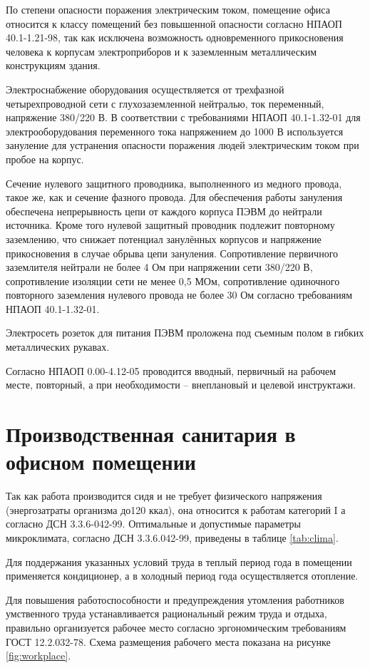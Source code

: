 По степени опасности поражения электрическим током, помещение офиса относится к классу помещений без повышенной
опасности согласно НПАОП 40.1-1.21-98, так как исключена возможность одновременного прикосновения человека к корпусам
электроприборов и к заземленным металлическим конструкциям здания.

Электроснабжение оборудования осуществляется от трехфазной четырехпроводной сети с глухозаземленной нейтралью,
ток переменный, напряжение 380/220 В. В соответствии с требованиями НПАОП 40.1-1.32-01 для электрооборудования
переменного тока напряжением до 1000 В используется зануление для устранения опасности поражения людей электрическим
током при пробое на корпус. 

Сечение нулевого защитного проводника, выполненного из медного провода, такое же, как и сечение фазного провода.
Для обеспечения работы зануления обеспечена непрерывность цепи от каждого корпуса ПЭВМ до нейтрали источника.
Кроме того нулевой защитный проводник подлежит повторному заземлению, что снижает потенциал занулённых корпусов
и напряжение прикосновения в случае обрыва цепи зануления. Сопротивление первичного заземлителя нейтрали не более
4 Ом при напряжении сети 380\slash220 В, сопротивление изоляции сети не менее 0,5 МОм, сопротивление одиночного повторного
заземления нулевого провода не более 30 Ом согласно требованиям НПАОП 40.1-1.32-01. 

Электросеть розеток для питания ПЭВМ проложена под съемным полом в гибких металлических рукавах.

Согласно НПАОП 0.00-4.12-05 проводится вводный, первичный на рабочем месте, повторный, а при необходимости -- 
внеплановый и целевой инструктажи.

\section{Производственная санитария в офисном помещении}

Так как работа производится сидя и не требует физического напряжения (энергозатраты организма до120 ккал),
она относится к работам категорий I а согласно ДСН 3.3.6-042-99. Оптимальные и допустимые параметры микроклимата,
согласно ДСН 3.3.6.042-99, приведены в таблице \ref{tab:clima}.

Для поддержания указанных условий труда в теплый период года в помещении применяется кондиционер,
а в холодный период года осуществляется отопление. 

Для повышения работоспособности и предупреждения утомления работников умственного труда  устанавливается
рациональный режим труда и отдыха, правильно организуется рабочее место согласно эргономическим  требованиям
ГОСТ 12.2.032-78. Схема размещения рабочего места показана на рисунке \ref{fig:workplace}.

